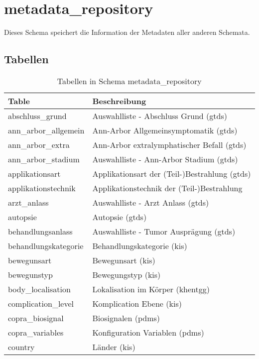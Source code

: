   \section{metadata\_repository}
  Dieses Schema speichert die Information der Metadaten aller anderen Schemata.
  
  \subsection{Tabellen}
  \label{tb:metarepo}
  \begin{longtable}{||p{5.3cm}|p{8.5cm}||}  	
  	\caption{Tabellen in Schema metadata\_repository}\\  	
  	\hline Table & Beschreibung \\ \hline \hline
  	abschluss\_grund & Auswahlliste - Abschluss Grund (\ac{gtds}) \\ \hline
  	ann\_arbor\_allgemein & Ann-Arbor Allgemeinsymptomatik (\ac{gtds}) \\ \hline
  	ann\_arbor\_extra & Ann-Arbor extralymphatischer Befall (\ac{gtds}) \\ \hline
  	ann\_arbor\_stadium & Auswahlliste - Ann-Arbor Stadium (\ac{gtds}) \\ \hline
  	applikationsart & Applikationsart der (Teil-)Bestrahlung (\ac{gtds}) \\ \hline
  	applikationstechnik & Applikationstechnik der (Teil-)Bestrahlung\\ \hline
  	arzt\_anlass & Auswahlliste - Arzt Anlass (\ac{gtds})\\ \hline
  	autopsie & Autopsie (\ac{gtds}) \\ \hline
  	behandlungsanlass & Auswahlliste - Tumor Ausprägung (\ac{gtds}) \\ \hline
  	behandlungskategorie & Behandlungskategorie (\ac{kis}) \\ \hline
  	bewegunsart & Bewegunsart (\ac{kis})\\ \hline
  	bewegunstyp & Bewegungstyp (\ac{kis}) \\ \hline
  	body\_localisation & Lokalisation im Körper (\ac{khentgg})\\ \hline
  	complication\_level & Komplication Ebene (\ac{kis}) \\ \hline
  	copra\_biosignal & Biosignalen (\ac{pdms}) \\ \hline
  	copra\_variables & Konfiguration Variablen (\ac{pdms}) \\ \hline
  	country & Länder (\ac{kis}) \\ \hline

\end{longtable}
